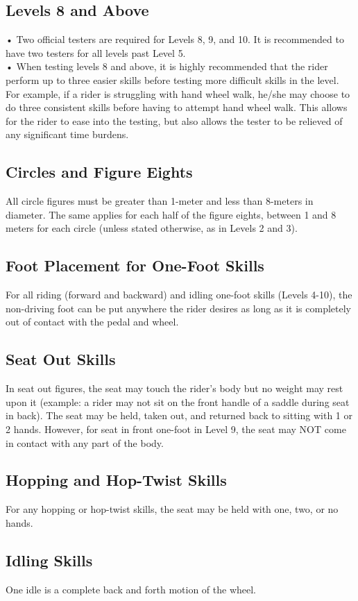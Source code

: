 \subsection{ Levels 8 and Above}
• Two official testers are required for Levels 8, 9, and 10. It is recommended to have two testers for all levels past
Level 5.\\
• When testing levels 8 and above, it is highly recommended that the rider perform up to three easier skills before
testing more difficult skills in the level. For example, if a rider is struggling with hand wheel walk, he/she may
choose to do three consistent skills before having to attempt hand wheel walk. This allows for the rider to ease
into the testing, but also allows the tester to be relieved of any significant time burdens.
\subsection{ Circles and Figure Eights}
All circle figures must be greater than 1-meter and less than 8-meters in diameter. The same applies for each half of the
figure eights, between 1 and 8 meters for each circle (unless stated otherwise, as in Levels 2 and 3).
\subsection{Foot Placement for One-Foot Skills}
For all riding (forward and backward) and idling one-foot skills (Levels 4-10), the non-driving foot can be put
anywhere the rider desires as long as it is completely out of contact with the pedal and wheel.
\subsection{ Seat Out Skills}
In seat out figures, the seat may touch the rider's body but no weight may rest upon it (example: a rider may not sit on
the front handle of a saddle during seat in back). The seat may be held, taken out, and returned back to sitting with 1 or
2 hands. However, for seat in front one-foot in Level 9, the seat may NOT come in contact with any part of the body.
\subsection{ Hopping and Hop-Twist Skills}
For any hopping or hop-twist skills, the seat may be held with one, two, or no hands.
\subsection{Idling Skills}
One idle is a complete back and forth motion of the wheel.
